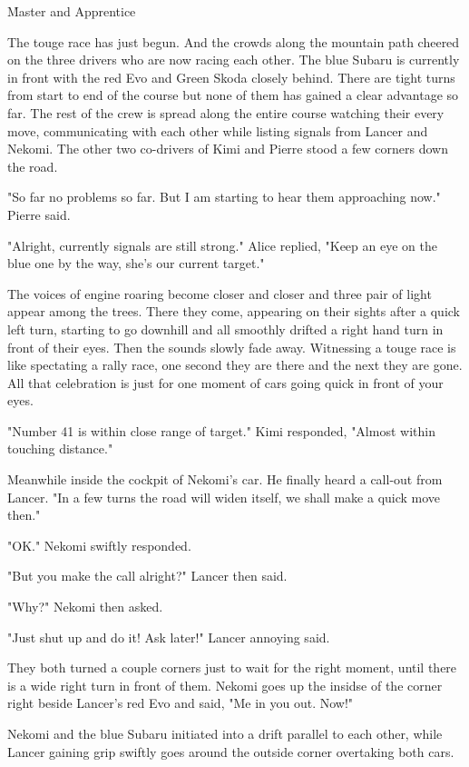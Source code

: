 \h{Master and Apprentice}

The touge race has just begun. 
And the crowds along the mountain path cheered on the three drivers who are now racing each other. 
The blue Subaru is currently in front with the red Evo and Green Skoda closely behind. 
There are tight turns from start to end of the course but none of them has gained a clear advantage so far.
The rest of the crew is spread along the entire course watching their every move, communicating with each other while listing signals from Lancer and Nekomi.
The other two co-drivers of Kimi and Pierre stood a few corners down the road.

"So far no problems so far. But I am starting to hear them approaching now." Pierre said.

"Alright, currently signals are still strong." Alice replied, "Keep an eye on the blue one by the way, she's our current target."

The voices of engine roaring become closer and closer and three pair of light appear among the trees. 
There they come, appearing on their sights after a quick left turn, starting to go downhill and all smoothly drifted a right hand turn in front of their eyes. 
Then the sounds slowly fade away. 
Witnessing a touge race is like spectating a rally race, one second they are there and the next they are gone. 
All that celebration is just for one moment of cars going quick in front of your eyes.

"Number 41 is within close range of target." Kimi responded, "Almost within touching distance."

Meanwhile inside the cockpit of Nekomi's car. He finally heard a call-out from Lancer. "In a few turns the road will widen itself, we shall make a quick move then."

"OK." Nekomi swiftly responded.

"But you make the call alright?" Lancer then said.

"Why?" Nekomi then asked.

"Just shut up and do it! Ask later!" Lancer annoying said.

They both turned a couple corners just to wait for the right moment, until there is a wide right turn in front of them. 
Nekomi goes up the insidse of the corner right beside Lancer's red Evo and said, "Me in you out. Now!"

Nekomi and the blue Subaru initiated into a drift parallel to each other, while Lancer gaining grip swiftly goes around the outside corner overtaking both cars.

